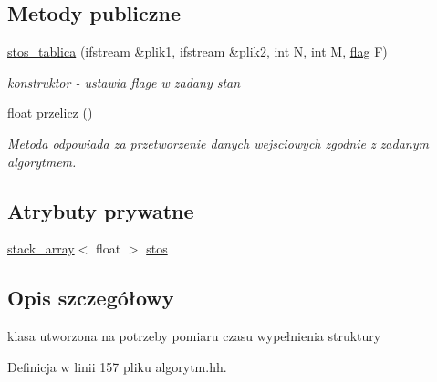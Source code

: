 \subsection*{\-Metody publiczne}
\begin{DoxyCompactItemize}
\item 
\hyperlink{classstos__tablica_a74b6909e896922fd4ebb355e1e996523}{stos\-\_\-tablica} (ifstream \&plik1, ifstream \&plik2, int \-N, int \-M, \hyperlink{stos_8hh_a7847560c748814fd3070e9149a9578bd}{flag} \-F)
\begin{DoxyCompactList}\small\item\em konstruktor -\/ ustawia flage w zadany stan \end{DoxyCompactList}\item 
float \hyperlink{classstos__tablica_a44ec89c9723d4034e46ae3b51b01faea}{przelicz} ()
\begin{DoxyCompactList}\small\item\em \-Metoda odpowiada za przetworzenie danych wejsciowych zgodnie z zadanym algorytmem. \end{DoxyCompactList}\end{DoxyCompactItemize}
\subsection*{\-Atrybuty prywatne}
\begin{DoxyCompactItemize}
\item 
\hyperlink{classstack__array}{stack\-\_\-array}$<$ float $>$ \hyperlink{classstos__tablica_a8aa72aa52bd2436cb12d9e1c8e077389}{stos}
\end{DoxyCompactItemize}


\subsection{\-Opis szczegółowy}
klasa utworzona na potrzeby pomiaru czasu wypełnienia struktury 

\-Definicja w linii 157 pliku algorytm.\-hh.



